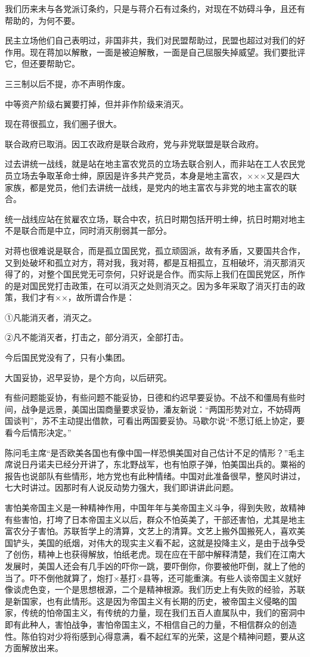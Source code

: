 我们历来未与各党派订条约，只是与蒋介石有过条约，对现在不妨碍斗争，且还有帮助的，为何不要。

民主立场他们自己表明过，非国非共，我们对民盟帮助过，民盟也超过对我们的好作用。现在蒋加以解散，一面是被迫解散，一面是自己屈服失掉威望。我们要批评它，但还要帮助它。

三三制以后不提，亦不声明作废。

中等资产阶级右翼要打掉，但并非作阶级来消灭。

现在蒋很孤立，我们圈子很大。

联合政府已取消。因工农政府是联合政府，党与非党联盟是联合政府。

过去讲统一战线，就是站在地主富农党员的立场去联合别人，而非站在工人农民党员立场去争取革命士绅，原因是许多共产党员，本身是地主富农，×××又是四大家族，都是党员，他们去讲统一战线，是党内的地主富农与非党的地主富农的联合。

统一战线应站在贫雇农立场，联合中农，抗日时期包括开明士绅，抗日时期对地主不是联合而是中立，同时消灭削弱其一部分。

对蒋也很难说是联合，而是孤立国民党，孤立顽固派，故有矛盾，又要国共合作，又到处破坏和孤立对方，蒋对我，我对蒋，都是互相孤立，互相破坏，消灭那消灭得了的，对整个国民党无可奈何，只好说是合作。而实际上我们在国民党区，所作的是对国民党打击政策，在可以消灭之处则消灭之。因为多年采取了消灭打击的政策，我们才有××，故所谓合作是：

①凡能消灭者，消灭之。

②凡不能消灭者，打击之，部分消灭，全部打击。

今后国民党没有了，只有小集团。

大国妥协，迟早妥协，是个方向，以后研究。

有些问题能妥协，有些问题不能妥协，日德和约迟早要妥协。不战不和僵局有些时间，战争是远景，美国出国商量要求妥协，潘友新说：“两国形势对立，不妨碍两国谈判”，苏不主动提出借款，可看出两国要妥协。马歇尔说“不愿订纸上协定，要看今后情形决定。”

陈问毛主席“是否欧美各国也有像中国一样恐惧美国对自己估计不足的情形？”毛主席说日丹诺夫已经分开讲了，东北野战军，也有怕原子弹，怕美国出兵的。粟裕的报告也说部队有些情形，地方党也有此种情绪。中国对此准备很早，整风时讲过，七大时讲过。因那时有人说反动势力强大，我们即讲讲此问题。

害怕美帝国主义是一种精神作用，中国年年与美帝国主义斗争，得到失败，故精神有些害怕，打垮了日本帝国主义以后，群众不怕英美了，干部还害怕，尤其是地主富农分子害怕。苏联哲学上的清算，文艺上的清算。文艺上搬外国搬死人，喜欢美国铲头，美国的纸烟，对伟大的现实主义看不起，这就是投降主义，是由于战争受了创伤，精神上也获得解放，怕纸老虎。现在应在干部中解释清楚，我们在江南大发展时，美国人还会有几手凶的吓你一跳，要吓倒你，你要被他吓倒，就上了他的当了。吓不倒他就算了，炮打×基打×县等，还可能重演。有些人谈帝国主义就好像谈虎色变，一个是思想根源，二个是精神根源。我们历史上有失败的经验，苏联是新国家，也有此情形。这是因为帝国主义有长期的历史，被帝国主义侵略的国家，传统的怕帝国主义，有传统的力量，现在我们五百人直属队中，我们的窑洞中即有此种人，害怕战争，害怕帝国主义，不相信自己的力量，不相信群众的创造性。陈伯钧对少将衔感到心得意满，看不起红军的光荣，这是个精神问题，要从这方面解放出来。

